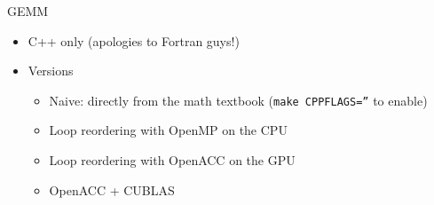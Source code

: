 \documentclass[aspectratio=169,12pt]{beamer}
\begin{document}
\begin{frame}[fragile]{GEMM}
  \begin{itemize}
  \item C++ only (apologies to Fortran guys!)
  \item Versions
    \begin{itemize}
    \item Naive: directly from the math textbook (\texttt{make CPPFLAGS=''} to enable)
    \item Loop reordering with OpenMP on the CPU
    \item Loop reordering with OpenACC on the GPU
    \item OpenACC + CUBLAS
    \end{itemize}
  \end{itemize}
\end{frame}
\end{document}
